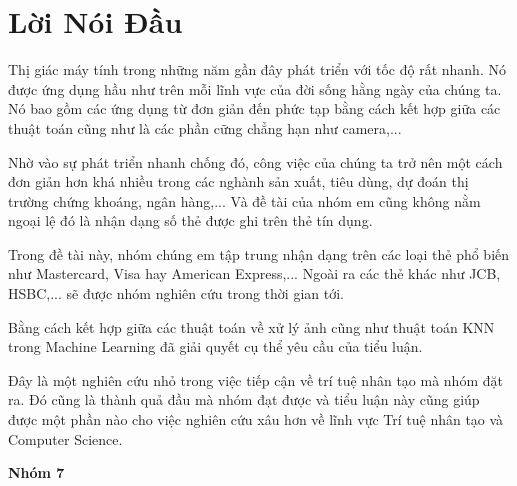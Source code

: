 \section*{Lời Nói Đầu}
\hspace{1cm} Thị giác máy tính trong những năm gần đây phát triển với
tốc độ rất nhanh. Nó được ứng dụng hầu như trên mỗi lĩnh vực của đời sống
hằng ngày của chúng ta. Nó bao gồm các ứng dụng từ đơn giản đến phức tạp
bằng cách kết hợp giữa các thuật toán cũng như là các phần cững chẳng hạn như
camera,... 

\hspace{1cm} Nhờ vào sự phát triển nhanh chống đó, công việc của chúng ta trở
nên một cách đơn giản hơn khá nhiều trong các nghành sản xuất, tiêu dùng, dự đoán
thị trường chứng khoáng, ngân hàng,... Và đề tài của nhóm em cũng không nằm ngoại lệ
đó là nhận dạng số thẻ được ghi trên thẻ tín dụng.

\hspace{1cm} Trong đề tài này, nhóm chúng em tập trung nhận dạng trên các loại thẻ phổ
biến như Mastercard, Visa hay American Express,... Ngoài ra các thẻ khác như JCB, HSBC,...
sẽ được nhóm nghiên cứu trong thời gian tới.

\hspace{1cm} Bằng cách kết hợp giữa các thuật toán về xử lý ảnh cũng như thuật toán KNN trong
Machine Learning đã giải quyết cụ thể yêu cầu của tiểu luận.

\hspace{1cm} Đây là một nghiên cứu nhỏ trong việc tiếp cận về trí tuệ nhân tạo
mà nhóm đặt ra. Đó cũng là thành quả đầu mà nhóm đạt được và tiểu luận này cũng giúp
được một phần nào cho việc nghiên cứu xâu hơn về lĩnh vực Trí tuệ nhân tạo và
Computer Science.

\vspace{5cm}

\begin{flushright}
   \textbf{Nhóm 7}
\end{flushright}